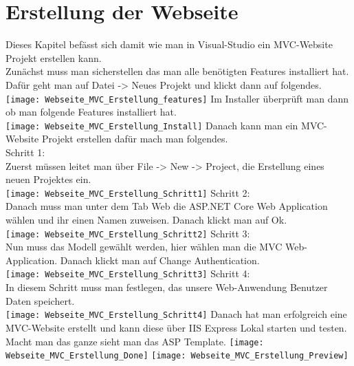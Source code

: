 {\section{Erstellung der Webseite}
\label{sec:erstellung_ws}
Dieses Kapitel befässt sich damit wie man in Visual-Studio ein MVC-Website Projekt erstellen kann.\\
Zunächst muss man sicherstellen das man alle benötigten Features installiert hat. Dafür geht man auf Datei -> Neues Projekt und klickt dann auf folgendes.\\
\texttt{[image: Webseite\_MVC\_Erstellung\_features]}
Im Installer überprüft man dann ob man folgende Features installiert hat.\\
\texttt{[image: Webseite\_MVC\_Erstellung\_Install]}
Danach kann man ein MVC-Website Projekt erstellen dafür mach man folgendes.\\
Schritt 1:\\
Zuerst müssen leitet man über File -> New -> Project, die Erstellung eines neuen Projektes ein.\\
\texttt{[image: Webseite\_MVC\_Erstellung\_Schritt1]}
Schritt 2:\\
Danach muss man unter dem Tab Web die ASP.NET Core Web Application wählen und ihr einen Namen zuweisen. Danach klickt man auf Ok.\\
\texttt{[image: Webseite\_MVC\_Erstellung\_Schritt2]}
Schritt 3:\\
Nun muss das Modell gewählt werden, hier wählen man die MVC Web-Application. Danach klickt man auf Change Authentication. \\
\texttt{[image: Webseite\_MVC\_Erstellung\_Schritt3]}
Schritt 4:\\
In diesem Schritt muss man festlegen, das unsere Web-Anwendung Benutzer Daten speichert. \\
\texttt{[image: Webseite\_MVC\_Erstellung\_Schritt4]}
Danach hat man erfolgreich eine MVC-Website erstellt und kann diese über IIS Express Lokal starten und testen. Macht man das ganze sieht man das ASP Template.
\texttt{[image: Webseite\_MVC\_Erstellung\_Done]}
\texttt{[image: Webseite\_MVC\_Erstellung\_Preview]}
}
